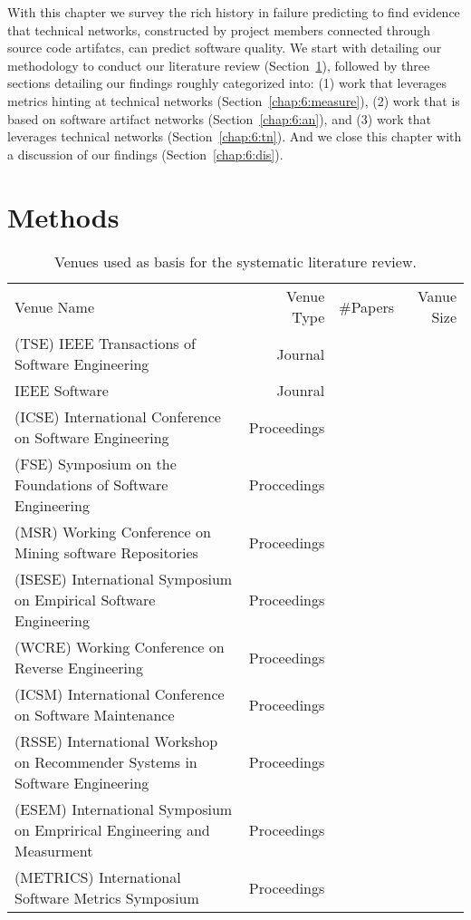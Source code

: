 \label{chap:tech-net}
With this chapter we survey the rich history in failure predicting to find evidence that technical networks, constructed by project members connected through source code artifatcs, can predict software quality.
We start with detailing our methodology to conduct our literature review (Section~\ref{chap:6:methods}), followed by three sections detailing our findings roughly categorized into: 
(1) work that leverages metrics hinting at technical networks (Section~\ref{chap:6:measure}),
(2) work that is based on software artifact networks (Section~\ref{chap:6:an}),
and (3) work that leverages technical networks (Section~\ref{chap:6:tn}).
And we close this chapter with a discussion of our findings (Section~\ref{chap:6:dis}).

\section{Methods}
\label{chap:6:methods}
\begin{table}[t]
\centering
\begin{tabular}{lrrr}
Venue Name & Venue Type & #Papers & Vanue Size\\
(TSE) IEEE Transactions of Software Engineering & Journal &\\
IEEE Software & Jounral & \\
(ICSE) International Conference on Software Engineering & Proceedings & \\
(FSE) Symposium on the Foundations of Software Engineering & Proccedings & \\
(MSR) Working Conference on Mining software Repositories & Proceedings & \\
(ISESE) International Symposium on Empirical Software Engineering & Proceedings & \\
(WCRE) Working Conference on Reverse Engineering & Proceedings & \\
(ICSM) International Conference on Software Maintenance & Proceedings & \\
(RSSE) International Workshop on Recommender Systems in Software Engineering & Proceedings & \\
(ESEM) International Symposium on Emprirical Engineering and Measurment & Proceedings & \\
(METRICS) International Software Metrics Symposium & Proceedings & \\
\end{tabular}
\label{chap:6:tab:venues}
\caption{Venues used as basis for the systematic literature review.}
\end{table}

